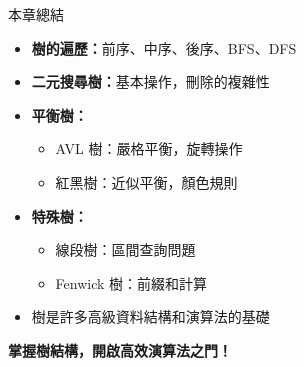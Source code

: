 \documentclass{beamer}
\begin{document}
\begin{frame}{本章總結}
\begin{itemize}
    \item \textbf{樹的遍歷：}前序、中序、後序、BFS、DFS
    \item \textbf{二元搜尋樹：}基本操作，刪除的複雜性
    \item \textbf{平衡樹：}
    \begin{itemize}
        \item AVL 樹：嚴格平衡，旋轉操作
        \item 紅黑樹：近似平衡，顏色規則
    \end{itemize}
    \item \textbf{特殊樹：}
    \begin{itemize}
        \item 線段樹：區間查詢問題
        \item Fenwick 樹：前綴和計算
    \end{itemize}
    \item 樹是許多高級資料結構和演算法的基礎
\end{itemize}

\vspace{1em}
\begin{center}
    \textbf{掌握樹結構，開啟高效演算法之門！}
\end{center}
\end{frame}
\end{document}
